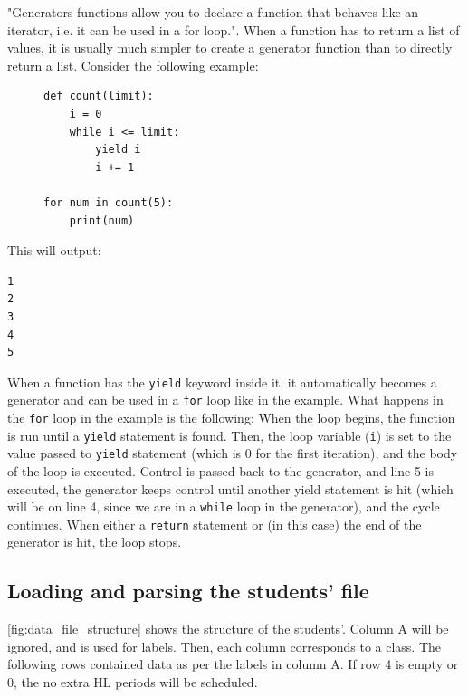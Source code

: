 \documentclass[12pt]{article}
\newcommand{\code}[1]{\texttt{\color{Grey}#1}}
\begin{document}
"Generators functions allow you to declare a function that behaves like an iterator, i.e. it
can be used in a for loop."\autocite{generators}. When a function has to return a list of
values, it is usually much simpler to create a generator function than to directly return a
list. Consider the following example: \vspace{-6mm}
%
\begin{figure}[H]
    \caption{}\vspace{-6mm}
\begin{verbatim}
def count(limit):
    i = 0
    while i <= limit:
        yield i
        i += 1

for num in count(5):
    print(num)
\end{verbatim}
\end{figure}
%
This will output:\vspace{-5mm}
%
\begin{verbatim}
1
2
3
4
5
\end{verbatim}
%
When a function has the \code{yield} keyword inside it, it automatically becomes a
generator and can be used in a \code{for} loop like in the example. What happens in the
\code{for} loop in the example is the following: When the loop begins, the function is run
until a \code{yield} statement is found. Then, the loop variable (\code{i}) is set to
the value passed to \code{yield} statement (which is 0 for the first iteration), and the
body of the loop is executed. Control is passed back to the generator, and line 5 is
executed, the generator keeps control until another yield statement is hit (which will be on
line 4, since we are in a \code{while} loop in the generator), and the cycle continues.
When either a \code{return} statement or (in this case) the end of the generator is hit,
the loop stops.

\subsection{Loading and parsing the students' file}

\autoref{fig:data_file_structure} shows the structure of the students'. Column A will be
ignored, and is used for labels.  Then, each column corresponds to a class. The following
rows contained data as per the labels in column A. If row 4 is empty or 0, the no extra HL
periods will be scheduled. 
\end{document}
